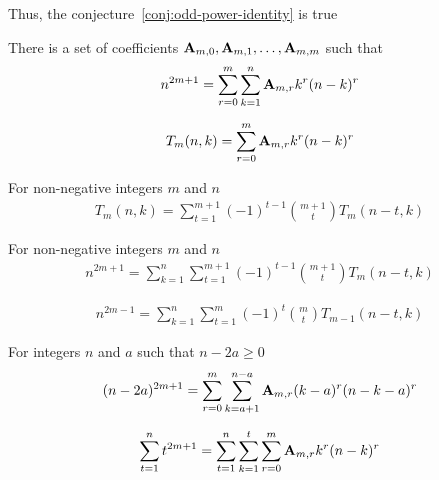 Thus, the conjecture~\eqref{conj:odd-power-identity} is true

\begin{theorem}
    \label{theorem:odd-power-identity}
    There is a set of coefficients ${\mathbf{A}} \sb{m,0}, {\mathbf{A}} \sb{m,1}, \ldots, {\mathbf{A}} \sb{m,m}$ such that
    \begin{align*}
        n^{2m+1} = \sum_{r=0}^{m} \sum_{k=1}^{n} {\mathbf{A}} \sb{m,r} k^r (n-k)^r
    \end{align*}
\end{theorem}

\begin{definition}
    \label{def:bivariate-sum-Tm}
    \begin{align*}
        T_{m}(n,k) = \sum_{r=0}^{m} {\mathbf{A}} \sb{m,r} k^r (n-k)^r
    \end{align*}
\end{definition}

\begin{proposition}
    \label{prop:Tm-recurrence}
    For non-negative integers $m$ and $n$
    \begin{align*}
        T_{m} (n, k) = \sum_{t=1}^{m+1} (-1)^{t-1} \binom{m+1}{t} T_{m} (n-t, k)
    \end{align*}
\end{proposition}

\begin{proposition}
    \label{prop:odd-power-decomposition}
    For non-negative integers $m$ and $n$
    \begin{align*}
        n^{2m+1} = \sum_{k=1}^{n} \sum_{t=1}^{m+1} (-1)^{t-1} \binom{m+1}{t} T_{m} (n-t, k)
    \end{align*}
\end{proposition}

\begin{corollary}
    \label{cor:odd-power-decomposition-m-1}
    \begin{align*}
        n^{2m-1} = \sum_{k=1}^{n} \sum_{t=1}^{m} (-1)^t \binom{m}{t} T_{m-1} (n-t, k)
    \end{align*}
\end{corollary}

\begin{proposition}
    \label{prop:odd-power-binomial}
    For integers $n$ and $a$ such that $n-2a \geq 0$
    \begin{align*}
    (n-2a)^{2m+1} = \sum_{r=0}^{m} \sum_{k=a+1}^{n-a} {\mathbf{A}} \sb{m,r} (k-a)^r (n-k-a)^r
    \end{align*}
\end{proposition}

\begin{proposition}
    \label{prop:sum-of-odd-powers}
    \begin{align*}
        \sum_{t=1}^{n} t^{2m+1} = \sum_{t=1}^{n} \sum_{k=1}^{t} \sum_{r=0}^{m} {\mathbf{A}} \sb{m,r} k^r (n-k)^r
    \end{align*}
\end{proposition}

